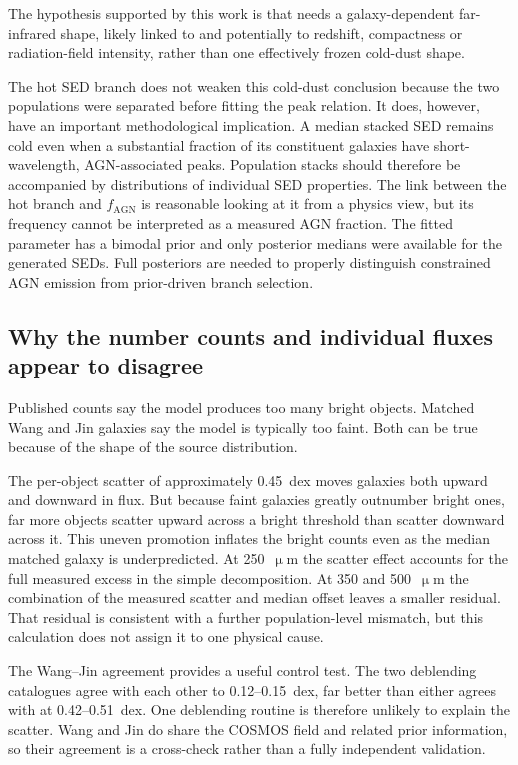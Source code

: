 \documentclass[12pt,a4paper]{article}
\begin{document}
The hypothesis supported by this work is that \popcosmos{} needs a galaxy-dependent
far-infrared shape, likely linked to \LIR{} and potentially to redshift, compactness
or radiation-field intensity, rather than one effectively frozen cold-dust shape.

The hot SED branch does not weaken this cold-dust conclusion because the two populations
were separated before fitting the peak relation. It does, however, have an important
methodological implication. A median stacked SED remains cold even when a substantial
fraction of its constituent galaxies have short-wavelength, AGN-associated peaks.
Population stacks should therefore
be accompanied by distributions of individual SED properties. The link
between the hot branch and $f_\mathrm{AGN}$ is reasonable looking at it from a physics view, but its frequency
cannot be interpreted as a measured AGN fraction. The fitted parameter has a
bimodal prior and only posterior medians were available for the generated SEDs. Full
posteriors are needed to properly distinguish constrained AGN emission from
prior-driven branch selection.

\subsection{Why the number counts and individual fluxes appear to disagree}
\label{sec:discussion:paradox}

Published counts say the model produces too many bright objects. Matched Wang and Jin
galaxies say the model is typically too faint. Both can be true because of the shape of
the source distribution.

The per-object scatter of approximately \SI{0.45}{dex} moves galaxies both upward and
downward in flux. But because faint galaxies greatly outnumber bright ones, far more
objects scatter upward across a bright threshold than scatter downward across it. This
uneven promotion inflates the bright counts even as the median matched galaxy is
underpredicted. At 250~$\upmu$m the scatter effect accounts for the full measured
excess in the simple decomposition. At 350 and 500~$\upmu$m the combination of the
measured scatter and median offset leaves a smaller residual. That residual is consistent
with a further population-level mismatch, but this calculation does not assign it to one
physical cause.

The Wang--Jin agreement provides a useful control test. The two deblending catalogues agree with
each other to 0.12--\SI{0.15}{dex}, far better than either agrees with \popcosmos{}
at 0.42--\SI{0.51}{dex}. One deblending routine is therefore unlikely to explain the
scatter. Wang and Jin do share the COSMOS field and related prior information, so their
agreement is a cross-check rather than a fully independent validation.
\end{document}
